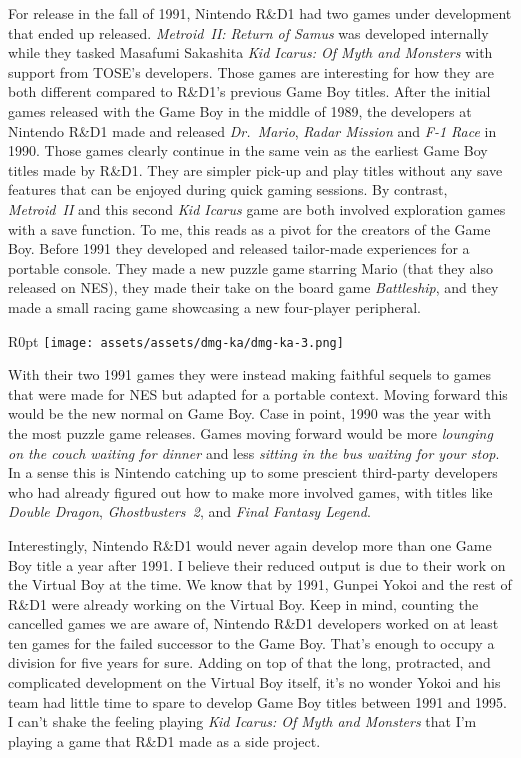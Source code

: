 \documentclass{book}
\begin{document}
For release in the fall of 1991, Nintendo R\&D1 had two games under development that ended up released. \emph{Metroid II: Return of Samus} was developed internally while they tasked Masafumi Sakashita \emph{Kid Icarus: Of Myth and Monsters} with support from TOSE’s developers. Those games are interesting for how they are both different compared to R\&D1’s previous Game Boy titles. After the initial games released with the Game Boy in the middle of 1989, the developers at Nintendo R\&D1 made and released \emph{Dr. Mario}, \emph{Radar Mission} and \emph{F-1 Race} in 1990. Those games clearly continue in the same vein as the earliest Game Boy titles made by R\&D1. They are simpler pick-up and play titles without any save features that can be enjoyed during quick gaming sessions. By contrast, \emph{Metroid II} and this second \emph{Kid Icarus} game are both involved exploration games with a save function. To me, this reads as a pivot for the creators of the Game Boy. Before 1991 they developed and released tailor-made experiences for a portable console. They made a new puzzle game starring Mario (that they also released on NES), they made their take on the board game \emph{Battleship}, and they made a small racing game showcasing a new four-player peripheral.

\begin{wrapfigure}{R}{0pt} \texttt{[image: assets/assets/dmg-ka/dmg-ka-3.png]}\end{wrapfigure}
With their two 1991 games they were instead making faithful sequels to games that were made for NES but adapted for a portable context. Moving forward this would be the new normal on Game Boy. Case in point, 1990 was the year with the most puzzle game releases. Games moving forward would be more \emph{lounging on the couch waiting for dinner} and less \emph{sitting in the bus waiting for your stop}. In a sense this is Nintendo catching up to some prescient third-party developers who had already figured out how to make more involved games, with titles like \emph{Double Dragon}, \emph{Ghostbusters 2}, and \emph{Final Fantasy Legend}.

Interestingly, Nintendo R\&D1 would never again develop more than one Game Boy title a year after 1991. I believe their reduced output is due to their work on the Virtual Boy at the time. We know that by 1991, Gunpei Yokoi and the rest of R\&D1 were already working on the Virtual Boy. Keep in mind, counting the cancelled games we are aware of, Nintendo R\&D1 developers worked on at least ten games for the failed successor to the Game Boy. That’s enough to occupy a division for five years for sure. Adding on top of that the long, protracted, and complicated development on the Virtual Boy itself, it’s no wonder Yokoi and his team had little time to spare to develop Game Boy titles between 1991 and 1995. I can’t shake the feeling playing \emph{Kid Icarus: Of Myth and Monsters} that I’m playing a game that R\&D1 made as a side project.
\end{document}

